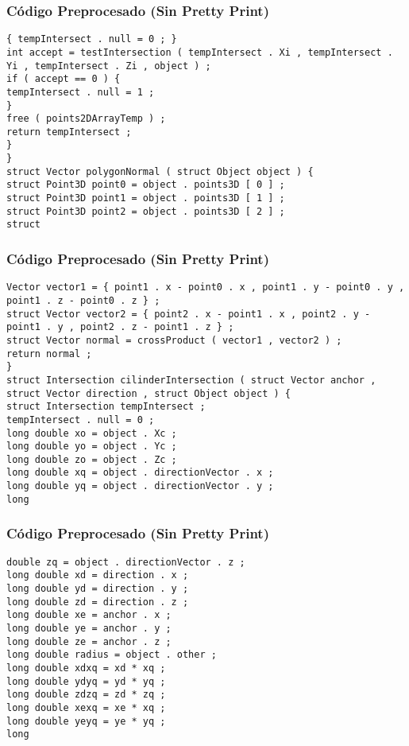 \documentclass{beamer}
\begin{document}
\begin{frame}[fragile]
\frametitle{C\'odigo Preprocesado (Sin Pretty Print)}
\begin{lstlisting}[style=CStyle]
{ tempIntersect . null = 0 ; } 
int accept = testIntersection ( tempIntersect . Xi , tempIntersect . Yi , tempIntersect . Zi , object ) ; 
if ( accept == 0 ) { 
tempIntersect . null = 1 ; 
} 
free ( points2DArrayTemp ) ; 
return tempIntersect ; 
} 
} 
struct Vector polygonNormal ( struct Object object ) { 
struct Point3D point0 = object . points3D [ 0 ] ; 
struct Point3D point1 = object . points3D [ 1 ] ; 
struct Point3D point2 = object . points3D [ 2 ] ; 
struct \end{lstlisting}
\end{frame}
\begin{frame}[fragile]
\frametitle{C\'odigo Preprocesado (Sin Pretty Print)}
\begin{lstlisting}[style=CStyle]
Vector vector1 = { point1 . x - point0 . x , point1 . y - point0 . y , point1 . z - point0 . z } ; 
struct Vector vector2 = { point2 . x - point1 . x , point2 . y - point1 . y , point2 . z - point1 . z } ; 
struct Vector normal = crossProduct ( vector1 , vector2 ) ; 
return normal ; 
} 
struct Intersection cilinderIntersection ( struct Vector anchor , struct Vector direction , struct Object object ) { 
struct Intersection tempIntersect ; 
tempIntersect . null = 0 ; 
long double xo = object . Xc ; 
long double yo = object . Yc ; 
long double zo = object . Zc ; 
long double xq = object . directionVector . x ; 
long double yq = object . directionVector . y ; 
long \end{lstlisting}
\end{frame}
\begin{frame}[fragile]
\frametitle{C\'odigo Preprocesado (Sin Pretty Print)}
\begin{lstlisting}[style=CStyle]
double zq = object . directionVector . z ; 
long double xd = direction . x ; 
long double yd = direction . y ; 
long double zd = direction . z ; 
long double xe = anchor . x ; 
long double ye = anchor . y ; 
long double ze = anchor . z ; 
long double radius = object . other ; 
long double xdxq = xd * xq ; 
long double ydyq = yd * yq ; 
long double zdzq = zd * zq ; 
long double xexq = xe * xq ; 
long double yeyq = ye * yq ; 
long \end{lstlisting}
\end{frame}
\end{document}
